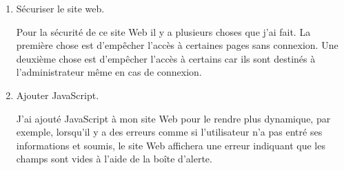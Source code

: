 \documentclass{article}
\begin{document}
\begin{enumerate}
\begin{enumerate}
         \hspace*{-1.05in}
               \noindent{}
         \item \textcolor{amethyst}{Sécuriser le site web}.
         
         \vspace{0.4cm}
                \setlength{\parindent}{1cm} Pour la sécurité de ce site Web il y a plusieurs choses que j'ai fait. La première chose est d'empêcher l'accès à certaines pages sans connexion. Une deuxième chose est d'empêcher l'accès à certains car ils sont destinés à l'administrateur même en cas de connexion.
         
         \item \textcolor{amethyst}{Ajouter JavaScript}.
         
         \vspace{0.4cm}
                \setlength{\parindent}{1cm} J'ai ajouté JavaScript à mon site Web pour le rendre plus dynamique, par exemple, lorsqu'il y a des erreurs comme si l'utilisateur n'a pas entré ses informations et soumis, le site Web affichera une erreur indiquant que les champs sont vides à l'aide de la boîte d'alerte.
         
         
         \vspace{4cm}
         \vspace{4.2cm}
   

\end{enumerate}
\end{enumerate}
\end{document}
